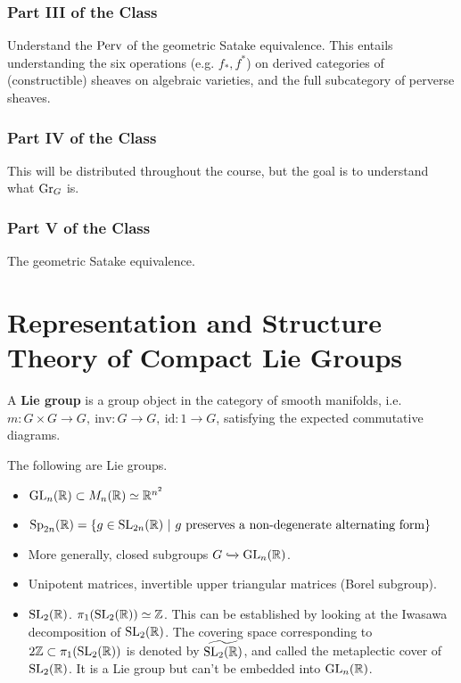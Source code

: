 \subsubsection{Part III of the Class} Understand the $\mathrm{Perv}$ of the geometric
Satake equivalence. This entails understanding the six operations (e.g. $f_*,
f^*$) on derived categories of (constructible) sheaves on algebraic varieties,
and the full subcategory of perverse sheaves.

\subsubsection{Part IV of the Class} This will be distributed throughout the
course, but the goal is to understand what $\mathrm{Gr}_{G}$ is.

\subsubsection{Part V of the Class} The geometric Satake equivalence.

\section{Representation and Structure Theory of Compact Lie Groups}

\begin{defn}
A \textbf{Lie group} is a group object in the category of smooth manifolds, i.e.
$m: G \times G \rightarrow G, \ \mathrm{inv}: G \rightarrow G,
\ \mathrm{id}: {1} \rightarrow G$, satisfying the expected commutative diagrams.
\end{defn}

\begin{exmpl}
The following are Lie groups.

\begin{itemize}
\item $\mathrm{GL}_{n}({\mathbb{R}}) \subset M_n(\mathbb{R}) \simeq \mathbb{R}^{n^2}$
\item $\mathrm{Sp}_{2n}({\mathbb{R}}) = \{ g \in \mathrm{SL}_{2n}({\mathbb{R}}) \ | \
  g \ \textrm{preserves a non-degenerate alternating form} \}$
\item More generally, closed subgroups $G \xhookrightarrow{} \mathrm{GL}_{n}({\mathbb{R}})$.
\item Unipotent matrices, invertible upper triangular matrices (Borel subgroup).
\item $\mathrm{SL}_{2}({\mathbb{R}})$. $\pi_1(\mathrm{SL}_{2}({\mathbb{R}})) \simeq \mathbb{Z}$. This can be
established by looking at the Iwasawa decomposition of $\mathrm{SL}_{2}({\mathbb{R}})$.
The covering space corresponding to $2 \mathbb{Z} \subset \pi_1(\mathrm{SL}_{2}({\mathbb{R}}))$ is
denoted by $\widetilde{\mathrm{SL}_{2}({\mathbb{R}})}$, and called the metaplectic cover of
$\mathrm{SL}_{2}({\mathbb{R}})$. It is a Lie group but can't be embedded into $\mathrm{GL}_{n}({\mathbb{R}})$.
\end{itemize}
\end{exmpl}


